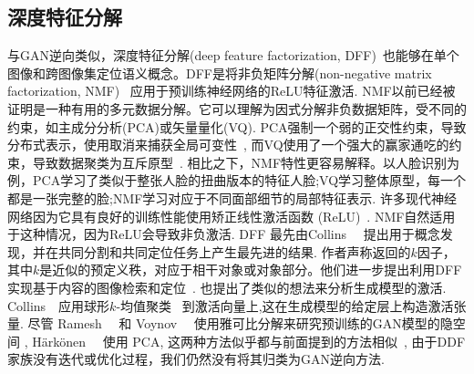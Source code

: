 \subsection{深度特征分解}
与GAN逆向类似，深度特征分解(deep feature factorization, DFF)~\cite{collins2018deep}也能够在单个图像和跨图像集定位语义概念。DFF是将非负矩阵分解(non-negative matrix factorization, NMF)~\cite{lee2001algorithms,lin2007projected} 应用于预训练神经网络的ReLU特征激活. 
NMF以前已经被证明是一种有用的多元数据分解。它可以理解为因式分解非负数据矩阵，受不同的约束，如主成分分析(PCA)或矢量量化(VQ).
PCA强制一个弱的正交性约束，导致分布式表示，使用取消来捕获全局可变性~\cite{wold1987principal,turk1991eigenfaces}, 而VQ使用了一个强大的赢家通吃的约束，导致数据聚类为互斥原型~\cite{gersho2012vector}. 
相比之下，NMF特性更容易解释。以人脸识别为例，PCA学习了类似于整张人脸的扭曲版本的特征人脸;VQ学习整体原型，每一个都是一张完整的脸;NMF学习对应于不同面部细节的局部特征表示.
许多现代神经网络因为它具有良好的训练性能使用矫正线性激活函数 (ReLU)~\cite{nair2010rectified}. 
NMF自然适用于这种情况，因为ReLU会导致非负激活.
DFF 最先由Collins~\etal~\cite{collins2018deep} 提出用于概念发现，并在共同分割和共同定位任务上产生最先进的结果. 作者声称返回的$k$因子，其中$k$是近似的预定义秩，对应于相干对象或对象部分。他们进一步提出利用DFF实现基于内容的图像检索和定位~\cite{collins2019dff}.
也提出了类似的想法来分析生成模型的激活. Collins~\etal~\cite{collins2020uncovering}应用球形$k$-均值聚类~\cite{buchta2012spherical} 到激活向量上,这在生成模型的给定层上构造激活张量.
尽管 Ramesh~\etal~\cite{ramesh2018spectral} 和 Voynov~\etal~\cite{voynov2020latent} 使用雅可比分解来研究预训练的GAN模型的隐空间 , Härkönen~\etal~\cite{eric2020GANSpace} 使用 PCA, 这两种方法似乎都与前面提到的方法相似~\cite{collins2018deep,collins2019dff,collins2020uncovering}, 由于DDF家族没有迭代或优化过程，我们仍然没有将其归类为GAN逆向方法.

